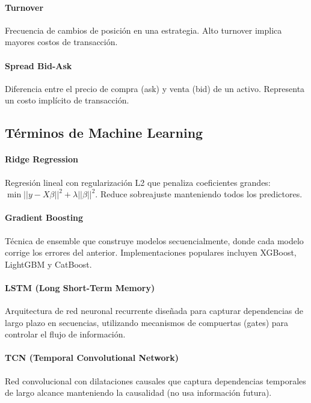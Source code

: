 \documentclass[11pt,a4paper]{article}
\begin{document}
\paragraph{Turnover} \label{glos:turnover}
Frecuencia de cambios de posición en una estrategia. Alto turnover implica mayores costos de transacción.

\paragraph{Spread Bid-Ask} \label{glos:spread}
Diferencia entre el precio de compra (ask) y venta (bid) de un activo. Representa un costo implícito de transacción.

\subsection*{Términos de Machine Learning}

\paragraph{Ridge Regression} \label{glos:ridge}
Regresión lineal con regularización L2 que penaliza coeficientes grandes: $\min ||y - X\beta||^2 + \lambda||\beta||^2$. Reduce sobreajuste manteniendo todos los predictores.

\paragraph{Gradient Boosting} \label{glos:gradient-boosting}
Técnica de ensemble que construye modelos secuencialmente, donde cada modelo corrige los errores del anterior. Implementaciones populares incluyen XGBoost, LightGBM y CatBoost.

\paragraph{LSTM (Long Short-Term Memory)} \label{glos:lstm}
Arquitectura de red neuronal recurrente diseñada para capturar dependencias de largo plazo en secuencias, utilizando mecanismos de compuertas (gates) para controlar el flujo de información.

\paragraph{TCN (Temporal Convolutional Network)} \label{glos:tcn}
Red convolucional con dilataciones causales que captura dependencias temporales de largo alcance manteniendo la causalidad (no usa información futura).
\end{document}
